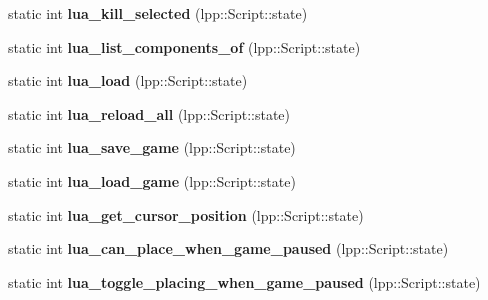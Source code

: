 \begin{DoxyCompactItemize}
\item 
static int {\bfseries lua\+\_\+kill\+\_\+selected} (lpp\+::\+Script\+::state)\hypertarget{class_lua_interface_ad3ef59891e0aba8fb768ae372c45742d}{}\label{class_lua_interface_ad3ef59891e0aba8fb768ae372c45742d}

\item 
static int {\bfseries lua\+\_\+list\+\_\+components\+\_\+of} (lpp\+::\+Script\+::state)\hypertarget{class_lua_interface_a542d175e198d07aedc7138f898bc83fd}{}\label{class_lua_interface_a542d175e198d07aedc7138f898bc83fd}

\item 
static int {\bfseries lua\+\_\+load} (lpp\+::\+Script\+::state)\hypertarget{class_lua_interface_a7deaf3615eb31fd09a1ddacd461ee93a}{}\label{class_lua_interface_a7deaf3615eb31fd09a1ddacd461ee93a}

\item 
static int {\bfseries lua\+\_\+reload\+\_\+all} (lpp\+::\+Script\+::state)\hypertarget{class_lua_interface_a708acacbb59eb74133655687fb91fb7a}{}\label{class_lua_interface_a708acacbb59eb74133655687fb91fb7a}

\item 
static int {\bfseries lua\+\_\+save\+\_\+game} (lpp\+::\+Script\+::state)\hypertarget{class_lua_interface_a7f7a0ba475425b5b58e95e1618c1bda7}{}\label{class_lua_interface_a7f7a0ba475425b5b58e95e1618c1bda7}

\item 
static int {\bfseries lua\+\_\+load\+\_\+game} (lpp\+::\+Script\+::state)\hypertarget{class_lua_interface_a57b4d9d83f74827e07aa1e32c7483dc4}{}\label{class_lua_interface_a57b4d9d83f74827e07aa1e32c7483dc4}

\item 
static int {\bfseries lua\+\_\+get\+\_\+cursor\+\_\+position} (lpp\+::\+Script\+::state)\hypertarget{class_lua_interface_aa6ce840b4264593baa5567a9eaa9a9dd}{}\label{class_lua_interface_aa6ce840b4264593baa5567a9eaa9a9dd}

\item 
static int {\bfseries lua\+\_\+can\+\_\+place\+\_\+when\+\_\+game\+\_\+paused} (lpp\+::\+Script\+::state)\hypertarget{class_lua_interface_a2ea3dfb29a9cf844908713e2a0cec5d9}{}\label{class_lua_interface_a2ea3dfb29a9cf844908713e2a0cec5d9}

\item 
static int {\bfseries lua\+\_\+toggle\+\_\+placing\+\_\+when\+\_\+game\+\_\+paused} (lpp\+::\+Script\+::state)\hypertarget{class_lua_interface_a59a4852b61dd0af2665185bca1755f59}{}\label{class_lua_interface_a59a4852b61dd0af2665185bca1755f59}


\end{DoxyCompactItemize}
